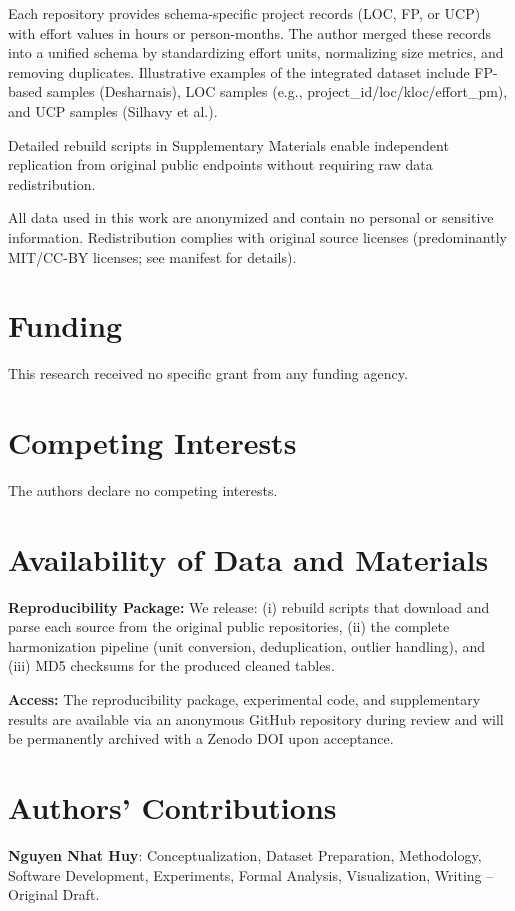 \documentclass{ieeeaccess}
\begin{document}
Each repository provides schema-specific project records (LOC, FP, or UCP) with
effort values in hours or person-months. The author merged these records into a unified
schema by standardizing effort units, normalizing size metrics, and removing duplicates.
Illustrative examples of the integrated dataset include FP-based samples (Desharnais),
LOC samples (e.g., project\_id/loc/kloc/effort\_pm), and UCP samples (Silhavy et al.).

Detailed rebuild scripts in Supplementary Materials enable independent replication from original public endpoints without requiring raw data redistribution.

All data used in this work are anonymized and contain no personal or sensitive information. Redistribution complies with original source licenses (predominantly MIT/CC-BY licenses; see manifest for details).

\section*{Funding}
This research received no specific grant from any funding agency.

\section*{Competing Interests}
The authors declare no competing interests.

\section*{Availability of Data and Materials}
\textbf{Reproducibility Package:} We release: (i) rebuild scripts that download and parse each source 
from the original public repositories, (ii) the complete harmonization pipeline (unit conversion, 
deduplication, outlier handling), and (iii) MD5 checksums for the produced cleaned tables. 

\textbf{Access:} The reproducibility package, experimental code, and supplementary results are available via 
an anonymous GitHub repository during review and will be permanently archived with a Zenodo DOI upon acceptance.

\section*{Authors' Contributions}
\textbf{Nguyen Nhat Huy}: Conceptualization, Dataset Preparation, Methodology, Software Development, 
Experiments, Formal Analysis, Visualization, Writing – Original Draft.
\end{document}
